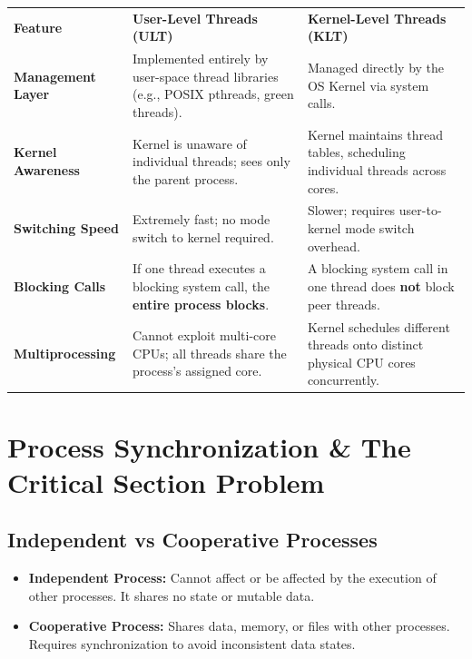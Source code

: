 \documentclass[11pt,a4paper]{article}
\begin{document}
\begin{center}
\begin{tabularx}{\linewidth}{L{3.2cm} X X}
  \color{white}\textbf{Feature} &
  \color{white}\textbf{User-Level Threads (ULT)} &
  \color{white}\textbf{Kernel-Level Threads (KLT)} \\
  \textbf{Management Layer} & Implemented entirely by user-space thread libraries (e.g., POSIX pthreads, green threads). & Managed directly by the OS Kernel via system calls. \\
  \textbf{Kernel Awareness} & Kernel is unaware of individual threads; sees only the parent process. & Kernel maintains thread tables, scheduling individual threads across cores. \\
  \textbf{Switching Speed} & Extremely fast; no mode switch to kernel required. & Slower; requires user-to-kernel mode switch overhead. \\
  \textbf{Blocking Calls} & If one thread executes a blocking system call, the \textbf{entire process blocks}. & A blocking system call in one thread does \textbf{not} block peer threads. \\
  \textbf{Multiprocessing} & Cannot exploit multi-core CPUs; all threads share the process's assigned core. & Kernel schedules different threads onto distinct physical CPU cores concurrently. \\
\end{tabularx}
\end{center}

\section{Process Synchronization \& The Critical Section Problem}

\subsection{Independent vs Cooperative Processes}

\begin{itemize}
    \item \textbf{Independent Process:} Cannot affect or be affected by the execution of other processes. It shares no state or mutable data.
    \item \textbf{Cooperative Process:} Shares data, memory, or files with other processes. Requires synchronization to avoid inconsistent data states.
\end{itemize}
\end{document}
